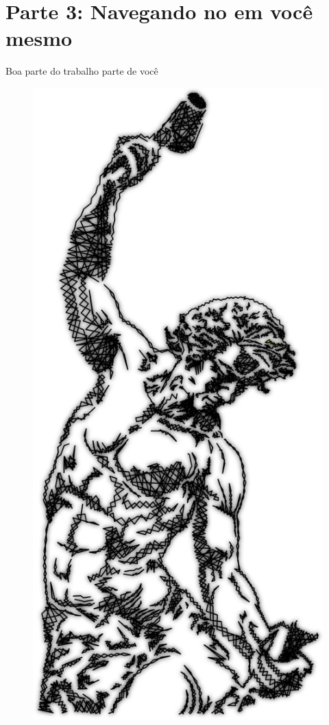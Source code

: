 \documentclass[10pt, compress, aspectratio=169]{beamer}
\begin{document}
\section{Parte 3: Navegando no em você mesmo}

\begin{frame}{Boa parte do trabalho parte de você}
  \begin{figure}
    \centering
    \includegraphics[width=\linewidth,
                     height=0.8\textheight,
                     keepaspectratio]{self_made2}
  \end{figure}
\end{frame}
\end{document}
